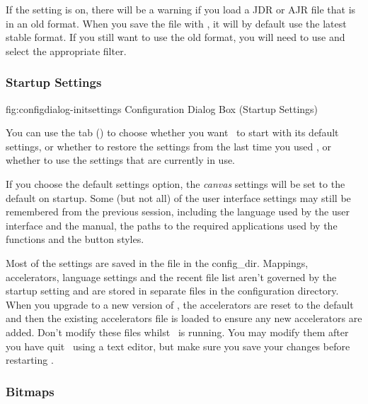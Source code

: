 
If the  setting is on, there will be a
warning if you load a \gls{JDR} or \gls{AJR} file that is in an
old format. When you save the file with , it will 
by default use the latest stable format. If you still want to use
the old format, you will need to use  and select
the appropriate filter.

\subsubsection{Startup Settings}\label{sec:initsettings}


\FloatFig
  {fig:configdialog-initsettings}
  {}
  {Configuration Dialog Box (Startup Settings)}

You can use the  tab
()
to choose whether you want \FlowframTk\ to start with its
default settings, or whether to restore the settings from the last
time you used \FlowframTk, or whether to use the settings that are
currently in use.

If you choose the default settings option, the \emph{\gls{canvas}}
settings will be set to the default on startup.  Some (but not all)
of the user interface settings may still be remembered from the
previous session, including the language used by the user interface
and the manual, the paths to the required applications used by the
 functions and the button styles.

Most of the settings are saved in the file  in the
\gls{config_dir}.  Mappings,
accelerators, language settings and the recent file list aren't
governed by the startup setting and are stored in separate files in
the configuration directory. When you upgrade to a new version of
\FlowframTk, the accelerators are reset to the default and then the
existing accelerators file is loaded to ensure any new accelerators
are added. Don't modify these files whilst \FlowframTk\ is running.
You may modify them after you have quit \FlowframTk\ using a text
editor, but make sure you save your changes before restarting
\FlowframTk.


\subsubsection{Bitmaps}\label{sec:bitmapconfig}

